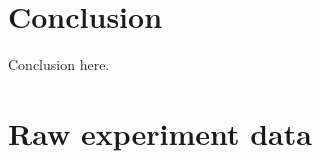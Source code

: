 \documentclass[journal,onecolumn,12pt]{IEEEtran}
\begin{document}
\section{Conclusion}
Conclusion here.






%


\appendices
\section{Raw experiment data}
\label{appendix:tables}
\end{document}
